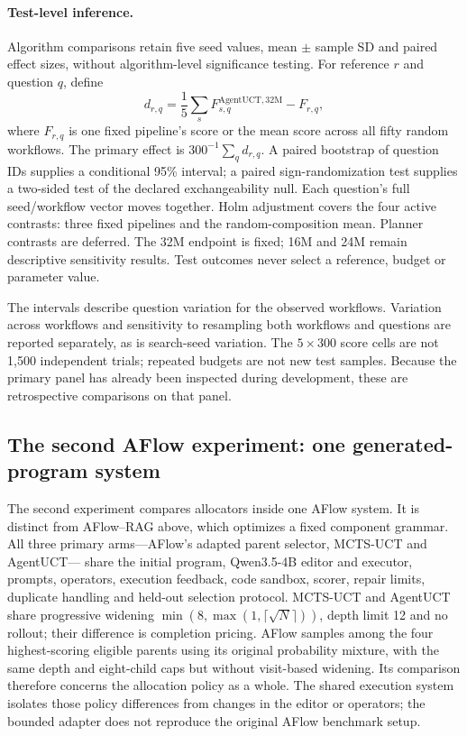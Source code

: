 \paragraph{Test-level inference.}
Algorithm comparisons retain five seed values, mean $\pm$ sample SD and
paired effect sizes, without algorithm-level significance testing.
For reference $r$ and question $q$, define
\[
 d_{r,q}=\frac{1}{5}\sum_s F_{s,q}^{\mathrm{AgentUCT},32\mathrm{M}}-F_{r,q},
\]
where $F_{r,q}$ is one fixed pipeline's score or the mean score across all
fifty random workflows. The primary effect is $300^{-1}\sum_q d_{r,q}$.
A paired bootstrap of question IDs supplies a conditional 95\% interval;
a paired sign-randomization test supplies a two-sided test of the declared
exchangeability null. Each question's full seed/workflow vector moves
together. Holm adjustment covers the four active contrasts: three fixed
pipelines and the random-composition mean. Planner contrasts are deferred.
The 32M endpoint is fixed; 16M and 24M remain descriptive sensitivity results.
Test outcomes never select a reference, budget or parameter value.

The intervals describe question variation for the observed workflows.
Variation across workflows and sensitivity to resampling both workflows
and questions are reported separately, as is search-seed variation.
The $5\times300$ score cells are
not 1,500 independent trials; repeated budgets are not new test samples.
Because the primary panel has already been inspected during development,
these are retrospective comparisons on that panel.

\subsection{The second AFlow experiment: one generated-program system}
\label{sec:aflow-system-study}
The second experiment compares allocators inside one AFlow system. It is
distinct from AFlow--RAG above, which optimizes a fixed component grammar.
All three primary arms---AFlow's adapted parent selector, MCTS-UCT and AgentUCT---
share the initial program, Qwen3.5-4B editor and executor, prompts,
operators, execution feedback, code sandbox, scorer, repair limits, duplicate
handling and held-out selection protocol. MCTS-UCT and AgentUCT share progressive
widening $\min(8,\max(1,\lceil\sqrt{N}\rceil))$, depth limit 12 and no rollout;
their difference is completion pricing. AFlow samples among the four
highest-scoring eligible parents using its original probability mixture,
with the same depth and eight-child caps but without visit-based widening.
Its comparison therefore concerns the allocation policy as a whole. The
shared execution system isolates those policy differences from changes in
the editor or operators; the bounded adapter does not reproduce the original
AFlow benchmark setup.

